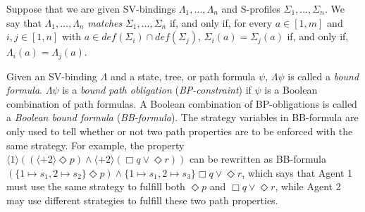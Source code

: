 \documentclass[11pt]{article}
\newcommand{\emdef}{\textit{def}}
\newcommand{\pfrr}{\Box}
\newcommand{\pevt}{\Diamond}
\begin{document}
Suppose that we are given SV-bindings $\Lambda_1,\ldots,\Lambda_n$
and S-profiles $\Sigma_1,\ldots,\Sigma_n$.   
We say that $\Lambda_1,\ldots,\Lambda_n$ {\em matches} 
$\Sigma_1,\ldots,\Sigma_n$ if, and only if, 
for every $a\in[1,m]$ and $i,j\in[1,n]$ 
with $a\in\emdef(\Sigma_i)\cap\emdef(\Sigma_j)$, 
$\Sigma_i(a)=\Sigma_j(a)$ if, and only if, 
$\Lambda_i(a)=\Lambda_j(a)$.  

Given an SV-binding $\Lambda$ 
and a state, tree, or path formula $\psi$, 
$\Lambda\psi$ is called a {\em bound formula}.  
$\Lambda\psi$ is a {\em bound path obligation} ({\em BP-constraint}) 
if $\psi$ is a Boolean combination of path formulas.  
A Boolean combination of BP-obligations is called a 
{\em Boolean bound formula} ({\em BB-formula}).  
The strategy variables in BB-formula are only used to tell 
whether or not two path properties are to be enforced with the same strategy.  
For example, the property  
$\langle 1\rangle((\langle+ 2\rangle\pevt p)\wedge 
\langle+ 2\rangle(\pfrr q\vee\pevt r))$ 
can be rewritten as BB-formula 
$(\{1\mapsto s_1,2\mapsto s_2\}\pevt p)\wedge 
\{1\mapsto s_1,2\mapsto s_3\}\pfrr q\vee\pevt r$, which says that 
Agent 1 must use the same strategy to fulfill  
both $\pevt p$ and $\pfrr q\vee\pevt r$, while 
Agent 2 may use different strategies to fulfill these two path 
properties.  
\end{document}
